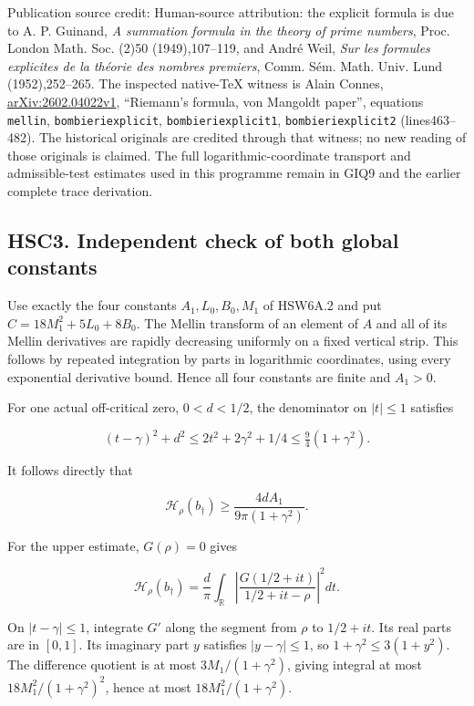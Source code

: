 Publication source credit: Human-source attribution: the explicit
formula is due to A. P. Guinand, \emph{A summation formula in the theory
of prime numbers}, Proc. London Math. Soc. (2)50 (1949),107--119, and
André Weil, \emph{Sur les formules explicites de la théorie des nombres
premiers}, Comm. Sém. Math. Univ. Lund (1952),252--265. The inspected
native-TeX witness is Alain Connes,
\href{https://arxiv.org/abs/2602.04022v1}{arXiv:2602.04022v1},
``Riemann's formula, von Mangoldt paper'', equations \texttt{mellin},
\texttt{bombieriexplicit}, \texttt{bombieriexplicit1},
\texttt{bombieriexplicit2} (lines463--482). The historical originals are
credited through that witness; no new reading of those originals is
claimed. The full logarithmic-coordinate transport and admissible-test
estimates used in this programme remain in GIQ9 and the earlier complete
trace derivation.

\subsection{HSC3. Independent check of both global
constants}\label{hsc3.-independent-check-of-both-global-constants}

Use exactly the four constants \(A_1,L_0,B_0,M_1\) of HSW6A.2 and put
\(C=18M_1^2+5L_0+8B_0\). The Mellin transform of an element of \(A\) and
all of its Mellin derivatives are rapidly decreasing uniformly on a
fixed vertical strip. This follows by repeated integration by parts in
logarithmic coordinates, using every exponential derivative bound. Hence
all four constants are finite and \(A_1>0\).

For one actual off-critical zero, \(0<d<1/2\), the denominator on
\(|t|\le1\) satisfies

\[
 (t-\gamma)^2+d^2\le2t^2+2\gamma^2+1/4
 \le\tfrac94(1+\gamma^2).
\]

It follows directly that

\[
 \mathcal H_\rho(b_\dagger)
 \ge \frac{4d A_1}{9\pi(1+\gamma^2)}.
\tag{HSC3.1}
\]

For the upper estimate, \(G(\rho)=0\) gives

\[
 \mathcal H_\rho(b_\dagger)
 =\frac d\pi\int_{\mathbb R}
 \left|\frac{G(1/2+it)}{1/2+it-\rho}\right|^2dt.
\tag{HSC3.2}
\]

On \(|t-\gamma|\le1\), integrate \(G'\) along the segment from \(\rho\)
to \(1/2+it\). Its real parts are in \([0,1]\). Its imaginary part \(y\)
satisfies \(|y-\gamma|\le1\), so \(1+\gamma^2\le3(1+y^2)\). The
difference quotient is at most \(3M_1/(1+\gamma^2)\), giving integral at
most \(18M_1^2/(1+\gamma^2)^2\), hence at most \(18M_1^2/(1+\gamma^2)\).

